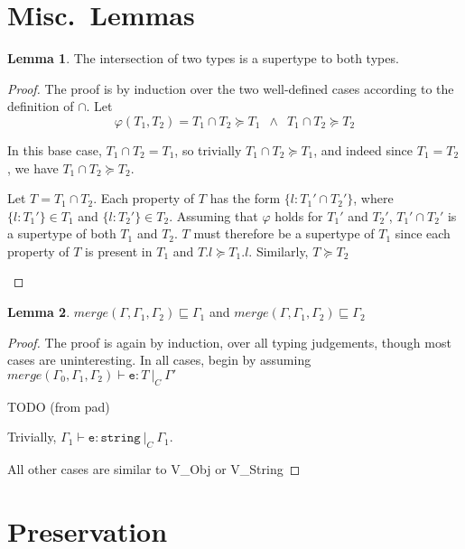 \documentclass[a4paper]{article}
\theoremstyle{definition}
\theoremstyle{dotless}
\newtheorem{lemma}{Lemma}[section]
\begin{document}
\section{Misc.~Lemmas}
\begin{lemma}\label{typeIntersect}
  The intersection of two types is a supertype to both types.
\end{lemma}
\begin{proof}
  The proof is by induction over the two well-defined cases according to the
  definition of $\cap$. Let 
  \begin{equation*}
	\varphi(T_1, T_2) = 
		T_1\cap T_2 \succeq T_1
 			\enspace \land \enspace
 		T_1\cap T_2 \succeq T_2
  \end{equation*}
  \begin{case}[$T_1 = T_2$]

	In this base case, $T_1 \cap T_2 = T_1$, so trivially 
	$T_1 \cap T_2 \succeq T_1$, and indeed since $T_1 = T_2$, we have 
	$T_1 \cap T_2 \succeq T_2$.

  	\end{case}
  	\begin{case}
	Let $T = T_1\cap T_2$. Each property of $T$ has the form $\{l : T_1' \cap T_2' \}$,
	where $\{l:T_1'\} \in T_1$ and $\{l:T_2'\} \in T_2$. Assuming that
	$\varphi$ holds for $T_1'$ and $T_2'$, $T_1' \cap T_2'$ is a supertype of
	both $T_1$ and $T_2$. $T$ must therefore be a supertype of $T_1$
	since each property of $T$ is present in $T_1$ and $T.l \succeq T_1.l$.
	Similarly, $T\succeq T_2$

  \end{case}

\end{proof}

\begin{lemma}\label{mergeEnv}
	$merge(\Gamma, \Gamma_1, \Gamma_2) \sqsubseteq \Gamma_1$ and 
	$merge(\Gamma, \Gamma_1, \Gamma_2) \sqsubseteq \Gamma_2$
\end{lemma}
\begin{proof}

  The proof is again by induction, over all typing judgements, though most cases are uninteresting.
  In all cases, begin by assuming 
	$merge(\Gamma_0, \Gamma_1, \Gamma_2) \vdash \mathtt{e} : T\ |_C\ \Gamma'$
  \begin{case}[IdType]
	TODO (from pad)

  \end{case}
  \begin{case}[V\_String]
  	Trivially, $\Gamma_1 \vdash \mathtt{e} : \mathtt{string}\ |_C\ \Gamma_1$.
  \end{case}

	All other cases are similar to V\_Obj or V\_String
\end{proof}
\section{Preservation}
\end{document}
